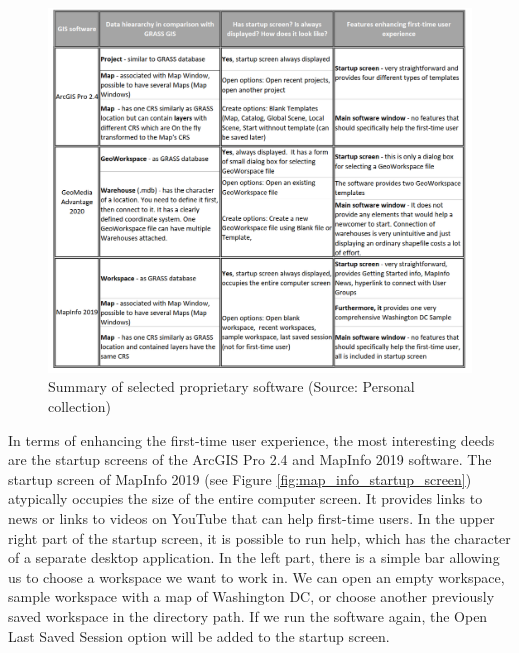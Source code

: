 \documentclass[a4paper,10pt,twoside]{article}
\begin{document}
\vspace{0.3cm}
\begin{figure}[hbt!] 
\begin{center}
\includegraphics[width=17cm]{../pictures/proprietary_software.png}
\caption[Summary of selected proprietary software]{Summary of selected proprietary software (Source: Personal collection)}
\label{fig:proprietary_software}
\end{center}
\end{figure}

\noindent In terms of enhancing the first-time user experience, the
most interesting deeds are the startup screens of the ArcGIS Pro 2.4
and MapInfo 2019 software. The startup screen of MapInfo 2019 (see
Figure \ref{fig:map_info_startup_screen}) atypically occupies the size
of the entire computer screen. It provides links to news
or links to videos on YouTube that can help first-time users. In the
upper right part of the startup screen, it is possible to run help,
which has the character of a separate desktop application. In the left
part, there is a simple bar allowing us to choose a workspace we want
to work in. We can open an empty workspace, sample workspace with a
map of Washington DC, or choose another previously saved workspace in
the directory path. If we run the software again, the Open Last Saved
Session option will be added to the startup screen.
\end{document}
